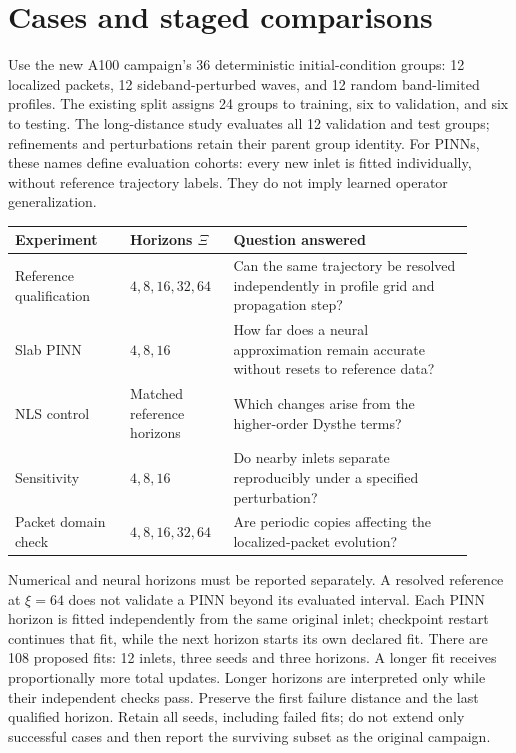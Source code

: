 \documentclass[11pt]{article}
\begin{document}
\section{Cases and staged comparisons}

Use the new A100 campaign's 36 deterministic initial-condition groups:
12 localized packets, 12 sideband-perturbed waves, and 12 random band-limited
profiles. The existing split assigns 24 groups to training, six to validation,
and six to testing. The long-distance study evaluates all 12 validation and
test groups; refinements and perturbations retain their parent group identity.
For PINNs, these names define evaluation cohorts: every new inlet is fitted
individually, without reference trajectory labels. They do not imply learned
operator generalization.

\begin{center}
\begin{tabular}{@{}>{\raggedright\arraybackslash}p{0.23\linewidth}>{\raggedright\arraybackslash}p{0.20\linewidth}>{\raggedright\arraybackslash}p{0.48\linewidth}@{}}
\toprule
Experiment & Horizons \(\Xi\) & Question answered\\
\midrule
Reference qualification & \(4,8,16,32,64\) & Can the same trajectory be
resolved independently in profile grid and propagation step?\\[3pt]
Slab PINN & \(4,8,16\) & How far does a neural approximation remain accurate
without resets to reference data?\\[3pt]
NLS control & Matched reference horizons & Which changes arise from the
higher-order Dysthe terms?\\[3pt]
Sensitivity & \(4,8,16\) & Do nearby inlets separate
reproducibly under a specified perturbation?\\[3pt]
Packet domain check & \(4,8,16,32,64\) & Are periodic copies
affecting the localized-packet evolution?\\
\bottomrule
\end{tabular}
\end{center}

Numerical and neural horizons must be reported separately. A resolved
reference at \(\xi=64\) does not validate a PINN beyond its evaluated interval.
Each PINN horizon is fitted independently from the same original inlet;
checkpoint restart continues that fit, while the next horizon starts its own
declared fit. There are 108 proposed fits: 12 inlets, three seeds and three
horizons. A longer fit receives proportionally more total updates.
Longer horizons are interpreted only while their independent checks pass.
Preserve the first failure distance and the last qualified horizon. Retain
all seeds, including failed fits; do not extend only successful cases and then
report the surviving subset as the original campaign.
\end{document}
